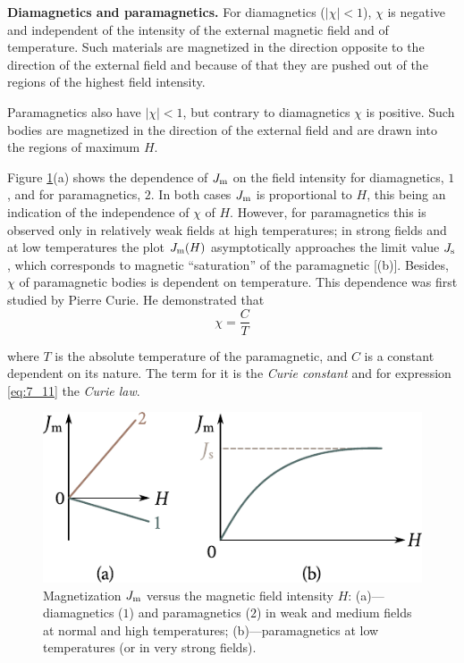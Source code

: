 \textbf{Diamagnetics and paramagnetics.} For diamagnetics ($|\chi|<1$), $\chi$ is negative and independent of the intensity of the external magnetic field and of temperature. Such materials are magnetized in the direction opposite to the direction of the external field and because of that they are pushed out of the regions of the highest field intensity.

Paramagnetics also have $|\chi|<1$, but contrary to diamagnetics $\chi$ is positive. Such bodies are magnetized in the direction of the external field and are drawn into the regions of maximum $H$.

Figure \ref{fig:7_1}(a) shows the dependence of $J_{\text{m}}$ on the field intensity for diamagnetics, $1$, and for paramagnetics, $2$. In both cases $J_{\text{m}}$ is proportional to $H$, this being an indication of the independence of $\chi$ of $H$. However, for paramagnetics this is observed only in relatively weak fields at high temperatures; in strong fields and at low temperatures the plot $J_{\text{m}}(H)$ asymptotically approaches the limit value $J_{\text{s}}$, which corresponds to magnetic ``saturation'' of the paramagnetic [(b)]. Besides, $\chi$ of paramagnetic bodies is dependent on temperature. This dependence was first studied by Pierre Curie. He demonstrated that
\begin{equation}\label{eq:7_11}
    \chi = \frac{C}{T}
\end{equation}

\noindent
where $T$ is the absolute temperature of the paramagnetic, and $C$ is a constant dependent on its nature. The term for it is the \textit{Curie constant} and for expression \eqref{eq:7_11} the \textit{Curie law}.

\begin{figure}[t]
	\begin{center}
		\includegraphics[scale=1]{figures/ch_07/fig_7_1.pdf}
		\caption[]{Magnetization $J_{\text{m}}$ versus the magnetic field intensity $H$: (a)---diamagnetics ($1$) and paramagnetics ($2$) in weak and medium fields at normal and high temperatures; (b)---paramagnetics at low temperatures (or in very strong fields).}
		\label{fig:7_1}
	\end{center}
	\vspace{-0.7cm}
\end{figure}

